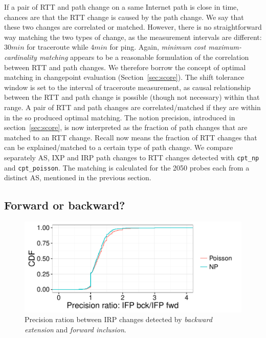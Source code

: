 If a pair of RTT and path change on a same Internet path is close in time, chances are that the RTT change is caused by the path change. We say that these two changes are correlated or matched. 
However, there is no straightforward way matching the two types of change, as the measurement intervals are different: $30min$ for traceroute while $4min$ for ping. 
Again, \textit{minimum cost maximum-cardinality matching} appears to be a reasonable formulation of the correlation between RTT and path changes.
We therefore borrow the concept of optimal matching in changepoint evaluation (Section~\ref{sec:score}).
The shift tolerance window is set to the interval of traceroute measurement, as causal relationship between the RTT and path change is possible (though not necessary) within that range.
A pair of RTT and path changes are correlated/matched if they are within in the so produced optimal matching.
The notion precision, introduced in section~\ref{sec:score}, is now interpreted as the fraction of path changes that are matched to an RTT change.
Recall now means the fraction of RTT changes that can be explained/matched to a certain type of path change.
We compare separately AS, IXP and \ac{IRP} path changes to RTT changes detected with \texttt{cpt\_np} and \texttt{cpt\_poisson}.
The matching is calculated for the 2050 probes each from a distinct AS, mentioned in the previous section.


\subsection{Forward or backward?}
\begin{figure}[!htb]
\centering
\includegraphics[width=.72\textwidth]{gfx/chap4/ifp_bck_ch_precision_gain_cdf.pdf}
\caption{Precision ration between IRP changes detected by \textit{backward extension} and \textit{forward inclusion}.}
\label{fig:IRP_bck_ch_precision_gain_cdf}
\end{figure}

